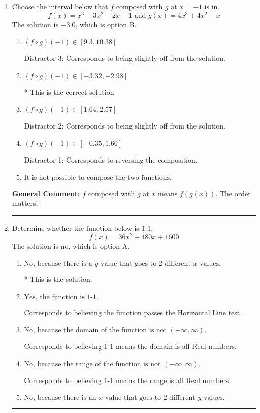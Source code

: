 \documentclass{extbook}[14pt]
\newcommand{\litem}[1]{\item #1

\rule{\textwidth}{0.4pt}}
\begin{document}
\begin{enumerate}\litem{
Choose the interval below that $f$ composed with $g$ at $x=-1$ is in.
\[ f(x) = x^{3} -3 x^{2} -2 x + 1 \text{ and } g(x) = 4x^{3} +4 x^{2} -x \]The solution is \( -3.0 \), which is option B.\begin{enumerate}[label=\Alph*.]
\item \( (f \circ g)(-1) \in [9.3, 10.38] \)

 Distractor 3: Corresponds to being slightly off from the solution.
\item \( (f \circ g)(-1) \in [-3.32, -2.98] \)

* This is the correct solution
\item \( (f \circ g)(-1) \in [1.64, 2.57] \)

 Distractor 2: Corresponds to being slightly off from the solution.
\item \( (f \circ g)(-1) \in [-0.35, 1.66] \)

 Distractor 1: Corresponds to reversing the composition.
\item \( \text{It is not possible to compose the two functions.} \)


\end{enumerate}

\textbf{General Comment:} $f$ composed with $g$ at $x$ means $f(g(x))$. The order matters!
}
\litem{
Determine whether the function below is 1-1.
\[ f(x) = 36 x^2 + 480 x + 1600 \]The solution is \( \text{no} \), which is option A.\begin{enumerate}[label=\Alph*.]
\item \( \text{No, because there is a $y$-value that goes to 2 different $x$-values.} \)

* This is the solution.
\item \( \text{Yes, the function is 1-1.} \)

Corresponds to believing the function passes the Horizontal Line test.
\item \( \text{No, because the domain of the function is not $(-\infty, \infty)$.} \)

Corresponds to believing 1-1 means the domain is all Real numbers.
\item \( \text{No, because the range of the function is not $(-\infty, \infty)$.} \)

Corresponds to believing 1-1 means the range is all Real numbers.
\item \( \text{No, because there is an $x$-value that goes to 2 different $y$-values.} \)


\end{enumerate}}
\end{enumerate}
\end{document}
